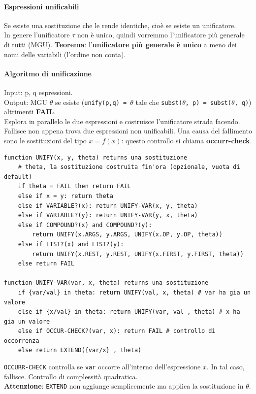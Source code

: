 \documentclass[10pt]{book}
\begin{document}
\paragraph{Espressioni unificabili} Se esiste una sostituzione che le rende identiche, cioè se esiste un unificatore.\\
In genere l'unificatore $\tau$ non è unico, quindi vorremmo l'unificatore più generale di tutti (MGU). \textbf{Teorema}: l'\textbf{unificatore più generale è unico} a meno dei nomi delle variabili (l'ordine non conta).
\paragraph{Algoritmo di unificazione} Input: p, q espressioni.\\
Output: MGU $\theta$ se esiste (\texttt{unify(p,q) = $\theta$} tale che \texttt{subst($\theta$, p) = subst($\theta$, q)}) altrimenti \textbf{FAIL}.\\
Esplora in parallelo le due espressioni e costruisce l'unificatore strada facendo. Fallisce non appena trova due espressioni non unificabili. Una causa del fallimento sono le sostituzioni del tipo $x = f(x)$: questo controllo si chiama \textbf{occurr-check}.
\begin{center}
	\begin{lstlisting}
function UNIFY(x, y, theta) returns una sostituzione
	# theta, la sostituzione costruita fin'ora (opzionale, vuota di default)
	if theta = FAIL then return FAIL
	else if x = y: return theta
	else if VARIABLE?(x): return UNIFY-VAR(x, y, theta)
	else if VARIABLE?(y): return UNIFY-VAR(y, x, theta)
	else if COMPOUND?(x) and COMPOUND?(y):
		return UNIFY(x.ARGS, y.ARGS, UNIFY(x.OP, y.OP, theta))
	else if LIST?(x) and LIST?(y):
		return UNIFY(x.REST, y.REST, UNIFY(x.FIRST, y.FIRST, theta))
	else return FAIL

function UNIFY-VAR(var, x, theta) returns una sostituzione
	if {var/val} in theta: return UNIFY(val, x, theta) # var ha gia un valore
	else if {x/val} in theta: return UNIFY(var, val , theta) # x ha gia un valore
	else if OCCUR-CHECK?(var, x): return FAIL # controllo di occorrenza
	else return EXTEND({var/x} , theta)
	\end{lstlisting}
\end{center}
\texttt{OCCURR-CHECK} controlla se \texttt{var} occorre all'interno dell'espressione $x$. In tal caso, fallisce. Controllo di complessità quadratica.\\
\textbf{Attenzione}: \texttt{EXTEND} non aggiunge semplicemente ma applica la sostituzione in $\theta$.
\end{document}
